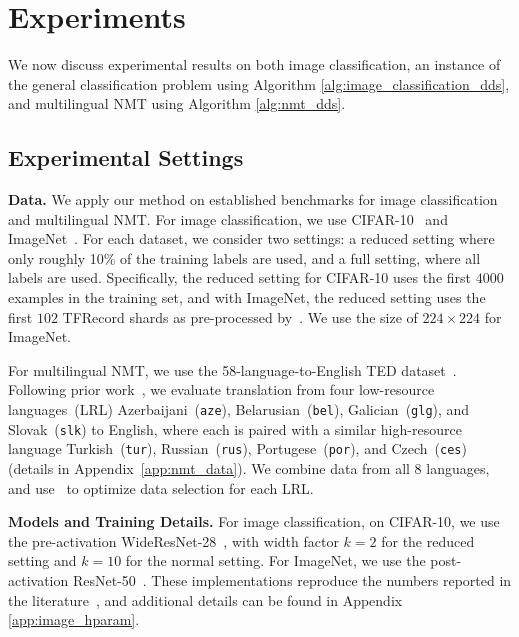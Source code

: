 \section{\label{sec:experiment}Experiments}
We now discuss experimental results on both image classification, an instance of the general classification problem using Algorithm \ref{alg:image_classification_dds}, and multilingual NMT using Algorithm \ref{alg:nmt_dds}.

\subsection{\label{exp:settings}Experimental Settings}

\noindent \textbf{Data.} We apply our method on established benchmarks for image classification and multilingual NMT.
For image classification, we use CIFAR-10~\citep{cifar10} and ImageNet~\citep{imagenet}. For each dataset, we consider two settings: a reduced setting where only roughly 10\% of the training labels are used, and a full setting, where all labels are used. Specifically, the reduced setting for CIFAR-10 uses the first $4000$ examples in the training set, and with ImageNet, the reduced setting uses the first $102$ TFRecord shards as pre-processed by~\citet{imagenet_generalize_better}. We use the size of $224 \times 224$ for ImageNet.

For multilingual NMT, we use the 58-language-to-English TED dataset~\citep{ted_pretrain_emb}. 
Following prior work~\citep{ted_pretrain_emb,rapid_adapt_nmt,sde}, we evaluate translation from four low-resource languages~(LRL) Azerbaijani~(\texttt{aze}), Belarusian~(\texttt{bel}), Galician~(\texttt{glg}), and Slovak~(\texttt{slk}) to English, where each is paired with a similar high-resource language Turkish~(\texttt{tur}), Russian~(\texttt{rus}), Portugese~(\texttt{por}), and Czech~(\texttt{ces}) (details in Appendix~\ref{app:nmt_data}).
We combine data from all 8 languages, and use \dds~to optimize data selection for each LRL. 

\noindent \textbf{Models and Training Details.}
For image classification, on CIFAR-10, we use the pre-activation WideResNet-28~\citep{wide_res_net}, with width factor $k=2$ for the reduced setting and $k=10$ for the normal setting. For ImageNet, we use the post-activation ResNet-50~\citep{res_net}. 
These implementations reproduce the numbers reported in the literature~\citep{wide_res_net,res_net,resnext}, and additional details can be found in Appendix \ref{app:image_hparam}.

